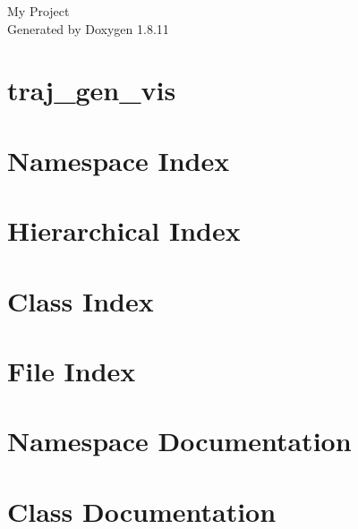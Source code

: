 \documentclass[twoside]{book}
\newcommand{\+}{\discretionary{\mbox{\scriptsize$\hookleftarrow$}}{}{}}
\newcommand{\clearemptydoublepage}{%
  \newpage{\pagestyle{empty}\cleardoublepage}%
}
\begin{document}
\hypersetup{pageanchor=false,
             bookmarksnumbered=true,
             pdfencoding=unicode
            }
\begin{titlepage}
\vspace*{7cm}
\begin{center}%
{\Large My Project }\\
\vspace*{1cm}
{\large Generated by Doxygen 1.8.11}\\
\end{center}
\end{titlepage}
\clearemptydoublepage
\tableofcontents
\clearemptydoublepage
{}
\hypersetup{pageanchor=true}

\chapter{traj\+\_\+gen\+\_\+vis}
\label{md_README}
\hypertarget{md_README}{}

\chapter{Namespace Index}

\chapter{Hierarchical Index}

\chapter{Class Index}

\chapter{File Index}

\chapter{Namespace Documentation}





\chapter{Class Documentation}















\end{document}

